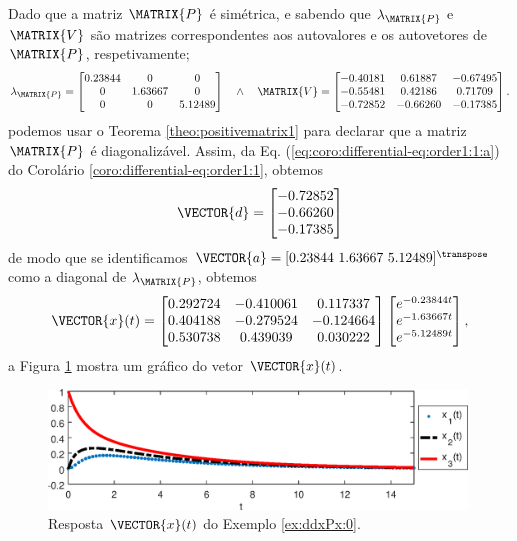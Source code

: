 \begin{SolutionT}
\label{ex:dxPx:0:sol1}
Dado que a matriz $\MATRIX{P}$ é simétrica, e
sabendo que $\lambda_{\MATRIX{P}}$ e $\MATRIX{V}$ são matrizes correspondentes aos autovalores e os autovetores de $\MATRIX{P}$,
respetivamente; 
\begin{equation}
\lambda_{\MATRIX{P}}=
\begin{bmatrix}
   0.23844 &       0 &       0\\
         0 & 1.63667 &       0\\
         0 &       0 & 5.12489
\end{bmatrix}
\quad \wedge \quad
\MATRIX{V}=
\begin{bmatrix}
  -0.40181 & 0.61887 &-0.67495\\
  -0.55481 & 0.42186 & 0.71709\\
  -0.72852 &-0.66260 &-0.17385
\end{bmatrix}.
\end{equation}
podemos usar o Teorema \ref{theo:positivematrix1} para declarar que a matriz $\MATRIX{P}$ é diagonalizável. 
Assim, da Eq. (\ref{eq:coro:differential-eq:order1:1:a}) do Corolário \ref{coro:differential-eq:order1:1},
obtemos
\begin{equation}
\VECTOR{d}=
\begin{bmatrix}
  -0.72852\\
  -0.66260\\
  -0.17385
\end{bmatrix}
\end{equation}
de modo que se identificamos $\VECTOR{a}=[0.23844~ 1.63667~ 5.12489]^{\transpose}$ como a diagonal de $\lambda_{\MATRIX{P}}$,
obtemos
\begin{equation}
 \VECTOR{x}(t)= 
\begin{bmatrix}
   0.292724 &-0.410061 & 0.117337\\
   0.404188 &-0.279524 &-0.124664\\
   0.530738 & 0.439039 & 0.030222
\end{bmatrix}
\begin{bmatrix}
   e^{-0.23844 t}\\
   e^{-1.63667 t}\\
   e^{-5.12489 t}
\end{bmatrix},
\end{equation}
a Figura \ref{fig:ex:dxPx:0} mostra um gráfico do vetor $\VECTOR{x}(t)$.
\end{SolutionT}
     \begin{figure}[!h]
         \centering
         \includegraphics[width=0.99\textwidth]{chapters/differential-eq/mfiles/primeiroorder/primeirooder1.eps}
         \caption{Resposta $\VECTOR{x}(t)$ do Exemplo \ref{ex:ddxPx:0}.}
         \label{fig:ex:dxPx:0}
     \end{figure}
